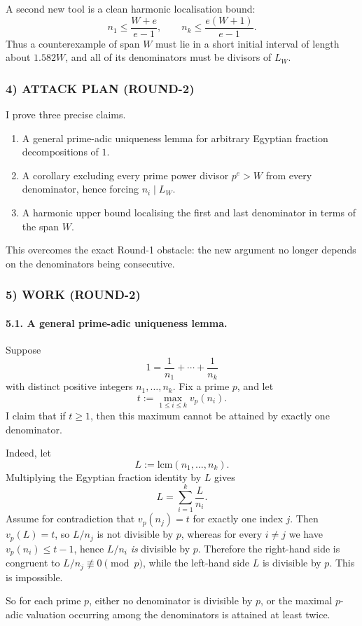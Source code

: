 A second new tool is a clean harmonic localisation bound:
\[
 n_1\le \frac{W+e}{e-1},
 \qquad
 n_k\le \frac{e(W+1)}{e-1}.
\]
Thus a counterexample of span $W$ must lie in a short initial interval of length about $1.582W$, and all of its denominators must be divisors of $L_W$.

\subsubsection*{4) ATTACK PLAN (ROUND-2)}
I prove three precise claims.
\begin{enumerate}
\item A general prime-adic uniqueness lemma for arbitrary Egyptian fraction decompositions of $1$.
\item A corollary excluding every prime power divisor $p^e>W$ from every denominator, hence forcing $n_i\mid L_W$.
\item A harmonic upper bound localising the first and last denominator in terms of the span $W$.
\end{enumerate}
This overcomes the exact Round-1 obstacle: the new argument no longer depends on the denominators being consecutive.

\subsubsection*{5) WORK (ROUND-2)}

\paragraph{5.1. A general prime-adic uniqueness lemma.}
Suppose
\[
1=\frac1{n_1}+\cdots+\frac1{n_k}
\]
with distinct positive integers $n_1,\dots,n_k$. Fix a prime $p$, and let
\[
 t:=\max_{1\le i\le k} v_p(n_i).
\]
I claim that if $t\ge 1$, then this maximum cannot be attained by exactly one denominator.

Indeed, let
\[
L:=\mathrm{lcm}(n_1,\dots,n_k).
\]
Multiplying the Egyptian fraction identity by $L$ gives
\[
L=\sum_{i=1}^k \frac{L}{n_i}.
\]
Assume for contradiction that $v_p(n_j)=t$ for exactly one index $j$. Then $v_p(L)=t$, so $L/n_j$ is not divisible by $p$, whereas for every $i\ne j$ we have $v_p(n_i)\le t-1$, hence $L/n_i$ \emph{is} divisible by $p$. Therefore the right-hand side is congruent to $L/n_j\not\equiv 0\pmod p$, while the left-hand side $L$ is divisible by $p$. This is impossible.

So for each prime $p$, either no denominator is divisible by $p$, or the maximal $p$-adic valuation occurring among the denominators is attained at least twice.

